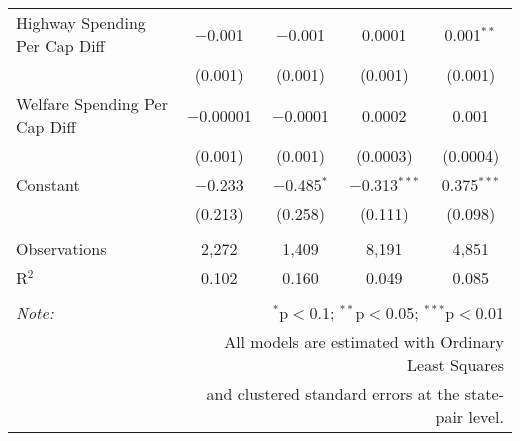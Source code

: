 \begin{table}[!htbp]
\begin{tabular}{@{\extracolsep{5pt}}lcccc}
  Highway Spending Per Cap Diff & $-$0.001 & $-$0.001 & 0.0001 & 0.001$^{**}$ \\ 
  & (0.001) & (0.001) & (0.001) & (0.001) \\ 
  Welfare Spending Per Cap Diff & $-$0.00001 & $-$0.0001 & 0.0002 & 0.001 \\ 
  & (0.001) & (0.001) & (0.0003) & (0.0004) \\ 
  Constant & $-$0.233 & $-$0.485$^{*}$ & $-$0.313$^{***}$ & 0.375$^{***}$ \\ 
  & (0.213) & (0.258) & (0.111) & (0.098) \\ 
 \hline \\[-1.8ex] 
Observations & 2,272 & 1,409 & 8,191 & 4,851 \\ 
R$^{2}$ & 0.102 & 0.160 & 0.049 & 0.085 \\ 
\hline 
\hline \\[-1.8ex] 
\textit{Note:}  & \multicolumn{4}{r}{$^{*}$p$<$0.1; $^{**}$p$<$0.05; $^{***}$p$<$0.01} \\ 
 & \multicolumn{4}{r}{All models are estimated with Ordinary Least Squares} \\ 
 & \multicolumn{4}{r}{and clustered standard errors at the state-pair level.} \\ 
\end{tabular} 
\end{table} 

